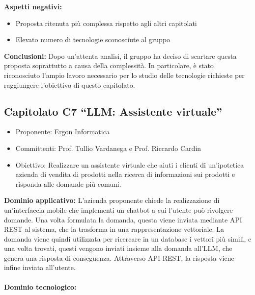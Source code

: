 \documentclass[10pt]{article}
\begin{document}
\textbf{Aspetti negativi:}
\begin{itemize}
    \item Proposta ritenuta più complessa rispetto agli altri capitolati
    \item Elevato numero di tecnologie sconosciute al gruppo
\end{itemize}
\textbf{Conclusioni:}
Dopo un'attenta analisi, il gruppo ha deciso di scartare questa proposta soprattutto a causa della complessità. In particolare, è stato riconosciuto l’ampio lavoro necessario per lo studio delle tecnologie richieste per raggiungere l’obiettivo di questo capitolato.

\subsection{Capitolato C7 “LLM: Assistente virtuale”}
\begin{itemize}
    \item Proponente: Ergon Informatica
    \item Committenti: Prof. Tullio Vardanega e Prof. Riccardo Cardin
    \item Obiettivo: Realizzare un assistente virtuale che aiuti i clienti di un’ipotetica azienda di vendita di prodotti nella ricerca di informazioni sui prodotti e risponda alle domande più comuni.
\end{itemize}
\textbf{Dominio applicativo:}
L’azienda proponente chiede la realizzazione di un’interfaccia mobile che implementi un chatbot a cui l’utente può rivolgere domande. Una volta formulata la domanda, questa viene inviata mediante API REST al sistema, che la trasforma in una rappresentazione vettoriale. La domanda viene quindi utilizzata per ricercare in un database i vettori più simili, e una volta trovati, questi vengono inviati insieme alla domanda all’LLM, che genera una risposta di conseguenza. Attraverso API REST, la risposta viene infine inviata all’utente.\\
\\
\textbf{Dominio tecnologico:}
\end{document}
